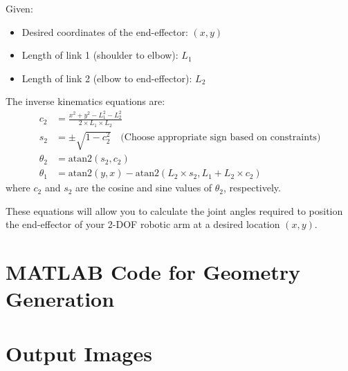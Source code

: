 \documentclass{article}
\begin{document}
Given:
\begin{itemize}
    \item Desired coordinates of the end-effector: \( (x, y) \)
    \item Length of link 1 (shoulder to elbow): \( L_1 \)
    \item Length of link 2 (elbow to end-effector): \( L_2 \)
\end{itemize}

The inverse kinematics equations are:
\begin{align*}
c_2 &= \frac{x^2 + y^2 - L_1^2 - L_2^2}{2 \times L_1 \times L_2} \\
s_2 &= \pm \sqrt{1 - c_2^2} \quad \text{(Choose appropriate sign based on constraints)} \\
\theta_2 &= \text{atan2}(s_2, c_2) \\
\theta_1 &= \text{atan2}(y, x) - \text{atan2}(L_2 \times s_2, L_1 + L_2 \times c_2)
\end{align*}
where \( c_2 \) and \( s_2 \) are the cosine and sine values of \( \theta_2 \), respectively.

These equations will allow you to calculate the joint angles required to position the end-effector of your 2-DOF robotic arm at a desired location \( (x, y) \).


\section{MATLAB Code for Geometry Generation}


\section{Output Images}
\end{document}
